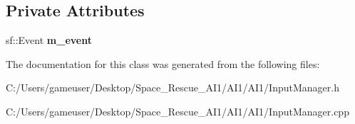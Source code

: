 \subsection*{Private Attributes}
\begin{DoxyCompactItemize}
\item 
\mbox{\label{class_input_manager_a948346da5431733440c865869196bdfc}} 
sf\+::\+Event {\bfseries m\+\_\+event}
\end{DoxyCompactItemize}


The documentation for this class was generated from the following files\+:\begin{DoxyCompactItemize}
\item 
C\+:/\+Users/gameuser/\+Desktop/\+Space\+\_\+\+Rescue\+\_\+\+A\+I1/\+A\+I1/\+A\+I1/Input\+Manager.\+h\item 
C\+:/\+Users/gameuser/\+Desktop/\+Space\+\_\+\+Rescue\+\_\+\+A\+I1/\+A\+I1/\+A\+I1/Input\+Manager.\+cpp\end{DoxyCompactItemize}
